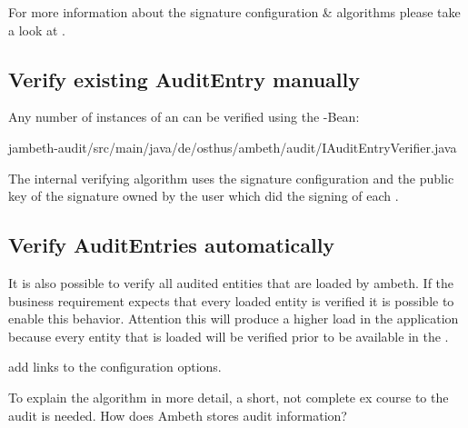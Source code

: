 For more information about the signature configuration \& algorithms please take a look at .

\subsection{Verify existing AuditEntry manually}
Any number of instances of an  can be verified using the -Bean:

	{jambeth-audit/src/main/java/de/osthus/ambeth/audit/IAuditEntryVerifier.java}

The internal verifying algorithm uses the signature configuration and the public key of the signature owned by the user which did the signing of each .

\subsection{Verify AuditEntries automatically}
It is also possible to verify all audited entities that are loaded by ambeth. If the business requirement expects that every loaded entity is verified it is possible to enable this behavior. Attention this will produce a higher load in the application because every entity that is loaded will be verified prior to be available in the . 

\TODO add links to the configuration options.
 
To explain the algorithm in more detail, a short, not complete ex course to the audit is needed.
How does Ambeth stores audit information?
\pagebreak
\def\showimgref{img/audit-verify.png}

